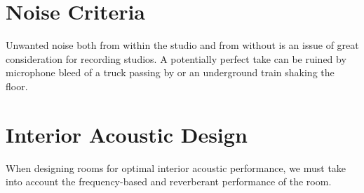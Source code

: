 \documentclass[10pt, twocolumn]{article}
\begin{document}
    \section{Noise Criteria}
        Unwanted noise both from within the studio and from without is an issue of great consideration for recording studios.
        A potentially perfect take can be ruined by microphone bleed of a truck passing by or an underground train shaking the floor.
        


    \section{Interior Acoustic Design}
        When designing rooms for optimal interior acoustic performance, we must take into account the frequency-based and reverberant performance of the room.
\end{document}
